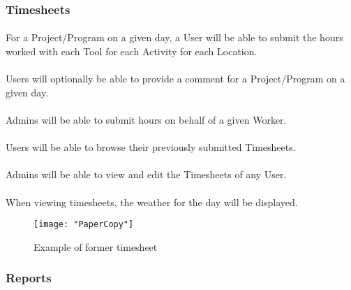 \documentclass[12pt]{article}
\begin{document}
\subsubsection{Timesheets}\label{sec:Timesheets}
\paragraph{} For a Project/Program on a given day, a User will be able to submit the hours worked with each Tool for each Activity for each Location.
\paragraph{} Users will optionally be able to provide a comment for a Project/Program on a given day.
\paragraph{} Admins will be able to submit hours on behalf of a given Worker.
\paragraph{} Users will be able to browse their previously submitted Timesheets.
\paragraph{} Admins will be able to view and edit the Timesheets of any User.
\paragraph{} When viewing timesheets, the weather for the day will be displayed.

\begin{figure}[H]
\begin{center}
\texttt{[image: "PaperCopy"]}
\caption{Example of former timesheet}
\label{fig:timesheet}
\end{center}
\end{figure}

\subsubsection{Reports}\label{sec:Reports}
\end{document}
